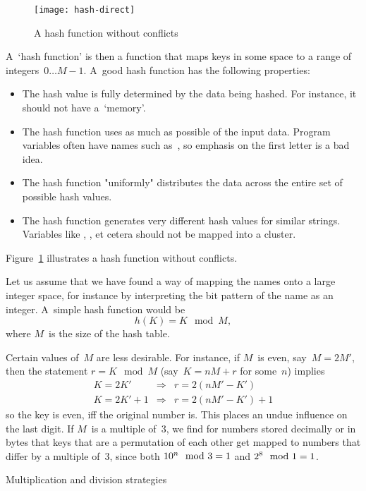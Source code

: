 \begin{figure}
\texttt{[image: hash-direct]}
\caption{A hash function without conflicts}
\label{fig:hash-direct}
\end{figure}

A~`hash function' is then a function that maps
keys in some space to a range of integers~$0\ldots{M-1}$. A~good hash
function has the following properties:
\begin{itemize}
\item The hash value is fully determined by the data being hashed. For
  instance, it should not have a~`memory'.
\item The hash function uses as much as possible of the input
  data. Program variables often have names such as~, so
  emphasis on the first letter is a bad idea.
\item The hash function "uniformly" distributes the data across the
  entire set of possible hash values.
\item The hash function generates very different hash values for
  similar strings. Variables like , , et cetera should
  not be mapped into a cluster.
\end{itemize}
Figure~\ref{fig:hash-direct} illustrates a hash function without conflicts.

Let us assume that we have found a way of mapping the names onto a
large integer space, for instance by interpreting the bit pattern of
the name as an integer. A~simple hash function would be
\begin{equation}
    h(K) = K\mod M, \label{eq:hash-div}\end{equation}
where $M$~is the size of the hash table.

Certain values of~$M$ are less desirable. For instance, if $M$~is
even, say~$M=2M'$, then the statement $r=K\mod M$ (say~$K=nM+r$ for
some~$n$) implies
\begin{eqnarray*}
K=2K'&\Rightarrow& r=2(nM'-K')\\
K=2K'+1&\Rightarrow& r=2(nM'-K')+1
\end{eqnarray*}
so the key is even, iff the original number is.
This places an undue influence on the last digit. If $M$~is a
multiple of~$3$, we find for numbers stored decimally or in bytes that
keys that are a permutation of each other get mapped to numbers that
differ by a multiple of~3, since both $10^n\mod 3=\nobreak1$ and
$2^8\mod 1=\nobreak1$.

 {Multiplication and division strategies}

